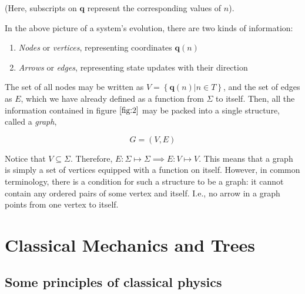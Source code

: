 \documentclass[12 pt]{article}
\begin{document}
(Here, subscripts on $\pmb{q}$ represent the corresponding values of $n$).

In the above picture of a system's evolution, there are two kinds of information:

\begin{enumerate}
  \item \emph{Nodes} or \emph{vertices}, representing coordinates $\pmb{q} \left( n \right)$

  \item \emph{Arrows} or \emph{edges}, representing state updates with their direction
\end{enumerate}

The set of all nodes may be written as $V = \left\{ \pmb{q} \left( n \right) \vert n \in T \right\}$, and the set of edges as $E$, which we have already defined as a function from $\Sigma$ to itself. Then, all the information contained in figure $\ref{fig:2}$ may be packed into a single structure, called a \emph{graph},

$$G = \left( V, E \right)$$

Notice that $V \subseteq \Sigma$. Therefore, $E : \Sigma \mapsto \Sigma \implies E : V \mapsto V$. This means that a graph is simply a set of vertices equipped with a function on itself. However, in common terminology, there is a condition for such a structure to be a graph: it cannot contain any ordered pairs of some vertex and itself. I.e., no arrow in a graph points from one vertex to itself.

\clearpage

\section{Classical Mechanics and Trees}

\subsection{Some principles of classical physics}
\end{document}

